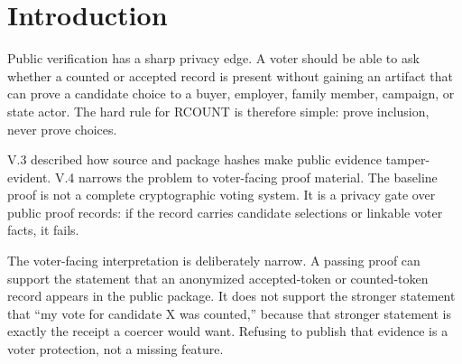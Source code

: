 \section{Introduction}

Public verification has a sharp privacy edge. A voter should be able to ask
whether a counted or accepted record is present without gaining an artifact that
can prove a candidate choice to a buyer, employer, family member, campaign, or
state actor. The hard rule for RCOUNT is therefore simple: prove inclusion,
never prove choices.

V.3 described how source and package hashes make public evidence tamper-evident.
V.4 narrows the problem to voter-facing proof material. The baseline proof is
not a complete cryptographic voting system. It is a privacy gate over public
proof records: if the record carries candidate selections or linkable voter
facts, it fails.

The voter-facing interpretation is deliberately narrow. A passing proof can
support the statement that an anonymized accepted-token or counted-token record
appears in the public package. It does not support the stronger statement that
``my vote for candidate X was counted,'' because that stronger statement is
exactly the receipt a coercer would want. Refusing to publish that evidence is a
voter protection, not a missing feature.
